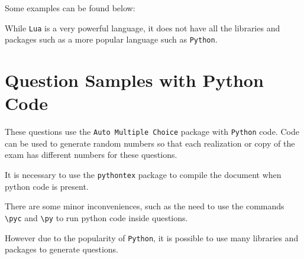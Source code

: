 \documentclass[a4paper]{article}
\begin{document}
Some examples can be found below:


While \texttt{Lua} is a very powerful language, it does not have all the libraries and packages such as a more popular language such as \texttt{Python}.

\section{Question Samples with Python Code}

These questions use the \texttt{Auto Multiple Choice} package with \texttt{Python} code.
Code can be used to generate random numbers so that each realization or copy of the exam has different numbers for these questions.

It is necessary to use the \texttt{pythontex} package to compile the document when python code is present.

There are some minor inconveniences, such as the need to use the commands \texttt{\textbackslash{}pyc{}} and \texttt{\textbackslash{}py{}} to run python code inside questions.

However due to the popularity of \texttt{Python}, it is possible to use many libraries and packages to generate questions.

\end{document}

